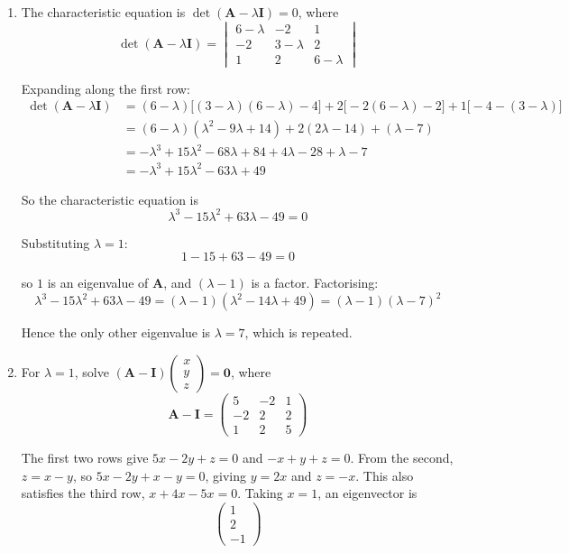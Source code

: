\documentclass[leqno]{article}
\begin{document}
\begin{enumerate}[
  label=\textbf{\arabic*.},
  leftmargin=*,
  topsep=0pt,
  partopsep=0pt,
  parsep=0pt
]
\vspace*{10pt}

\begin{djsSolution}
\begin{enumerate}[label=\textbf{(\alph*)}, start=1]
  \item The characteristic equation is \(\det(\mathbf{A}-\lambda\mathbf{I})=0\), where
\[
\det(\mathbf{A}-\lambda\mathbf{I})=\begin{vmatrix} 6-\lambda & -2 & 1 \\ -2 & 3-\lambda & 2 \\ 1 & 2 & 6-\lambda \end{vmatrix}
\]

Expanding along the first row:
\begin{align*}
\det(\mathbf{A}-\lambda\mathbf{I}) &= (6-\lambda)\big[(3-\lambda)(6-\lambda)-4\big]+2\big[-2(6-\lambda)-2\big]+1\big[-4-(3-\lambda)\big]\\
&= (6-\lambda)(\lambda^2-9\lambda+14)+2(2\lambda-14)+(\lambda-7)\\
&= -\lambda^3+15\lambda^2-68\lambda+84+4\lambda-28+\lambda-7\\
&= -\lambda^3+15\lambda^2-63\lambda+49
\end{align*}

So the characteristic equation is
\[
\lambda^3-15\lambda^2+63\lambda-49=0
\]

Substituting \(\lambda=1\):
\[
1-15+63-49=0
\]

so \(1\) is an eigenvalue of \(\mathbf{A}\), and \((\lambda-1)\) is a factor. Factorising:
\[
\lambda^3-15\lambda^2+63\lambda-49=(\lambda-1)(\lambda^2-14\lambda+49)=(\lambda-1)(\lambda-7)^2
\]

Hence the only other eigenvalue is \(\lambda=7\), which is repeated.

  \item For \(\lambda=1\), solve \((\mathbf{A}-\mathbf{I})\begin{pmatrix}x\\y\\z\end{pmatrix}=\mathbf{0}\), where
\[
\mathbf{A}-\mathbf{I}=\begin{pmatrix} 5 & -2 & 1 \\ -2 & 2 & 2 \\ 1 & 2 & 5 \end{pmatrix}
\]

The first two rows give \(5x-2y+z=0\) and \(-x+y+z=0\). From the second, \(z=x-y\), so \(5x-2y+x-y=0\), giving \(y=2x\) and \(z=-x\). This also satisfies the third row, \(x+4x-5x=0\). Taking \(x=1\), an eigenvector is
\[
\begin{pmatrix}1\\2\\-1\end{pmatrix}
\]


\end{enumerate}
\end{djsSolution}
\end{enumerate}
\end{document}
